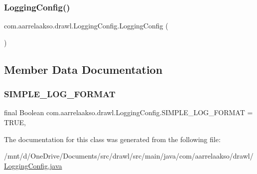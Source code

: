 \subsubsection{\texorpdfstring{Logging\+Config()}{LoggingConfig()}}
{\footnotesize\ttfamily com.\+aarrelaakso.\+drawl.\+Logging\+Config.\+Logging\+Config (\begin{DoxyParamCaption}{ }\end{DoxyParamCaption})}



\subsection{Member Data Documentation}
\mbox{\label{classcom_1_1aarrelaakso_1_1drawl_1_1_logging_config_a1cfdfab19a9fd0f78da68dc8bcce3144}} 
\subsubsection{\texorpdfstring{S\+I\+M\+P\+L\+E\+\_\+\+L\+O\+G\+\_\+\+F\+O\+R\+M\+AT}{SIMPLE\_LOG\_FORMAT}}
{\footnotesize\ttfamily final Boolean com.\+aarrelaakso.\+drawl.\+Logging\+Config.\+S\+I\+M\+P\+L\+E\+\_\+\+L\+O\+G\+\_\+\+F\+O\+R\+M\+AT = T\+R\+UE\hspace{0.3cm}{\ttfamily [static]}, {\ttfamily [private]}}



The documentation for this class was generated from the following file\+:\begin{DoxyCompactItemize}
\item 
/mnt/d/\+One\+Drive/\+Documents/src/drawl/src/main/java/com/aarrelaakso/drawl/\hyperlink{_logging_config_8java}{Logging\+Config.\+java}\end{DoxyCompactItemize}

